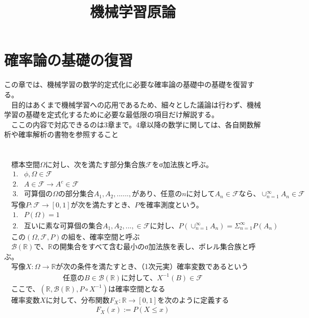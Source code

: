 \documentclass{jsarticle}
\title{機械学習原論}
\author{}
\begin{document}
\maketitle
\section{確率論の基礎の復習}
この章では、機械学習の数学的定式化に必要な確率論の基礎中の基礎を復習する。\\
　目的はあくまで機械学習への応用であるため、細々とした議論は行わず、機械学習の基礎を定式化するために必要な最低限の項目だけ解説する。\\
　ここの内容で対応できるのは3章まで。4章以降の数学に関しては、各自関数解析や確率解析の書物を参照すること　\\
 　\\
\scalebox{1.1}{1.確率空間と確率変数}\\
　標本空間$\Omega$に対し、次を満たす部分集合族$\mathcal{F}$をσ加法族と呼ぶ。
\begin{eqnarray}
&1.&\phi,\Omega\in\mathcal{F}\\
&2.&A\in\mathcal{F}\rightarrow A^c\in\mathcal{F}\\
&3.&可算個の\Omega の部分集合 A_1,A_2,......,があり、任意のnに対してA_n\in\mathcal{F}なら、\cup^\infty_{n=1} A_n\in\mathcal{F}
\end{eqnarray}
　写像$P:\mathcal{F}\rightarrow[0,1]$が次を満たすとき、$P$を確率測度という。
\begin{eqnarray}
&1.&P(\Omega)=1\\
&2.&互いに素な可算個の集合A_1,A_2,...,\in\mathcal{F}に対し、P(\cup^\infty_{n=1}A_n)=\Sigma^\infty_{n=1}P(A_n)
\end{eqnarray}
　この$(\Omega,\mathcal{F},P)$の組を、確率空間と呼ぶ\\
　$\mathcal{B}(\mathbb{R})$で、$\mathbb{R}$の開集合をすべて含む最小のσ加法族を表し、ボレル集合族と呼ぶ。\\
　写像$X:\Omega\rightarrow\mathbb{R}$が次の条件を満たすとき、（1次元実）確率変数であるという
\begin{eqnarray}
任意のB\in\mathcal{B}(\mathbb{R})に対して、X^{-1}(B)\in\mathcal{F}
\end{eqnarray}
　ここで、$(\mathbb{R},\mathcal{B}(\mathbb{R}),P\circ X^{-1})$は確率空間となる\\
　確率変数$X$に対して、分布関数$F_X:\mathbb{R}\rightarrow[0,1]$を次のように定義する
\begin{eqnarray}
F_X(x):=P(X\leq x)
\end{eqnarray}
\end{document}
